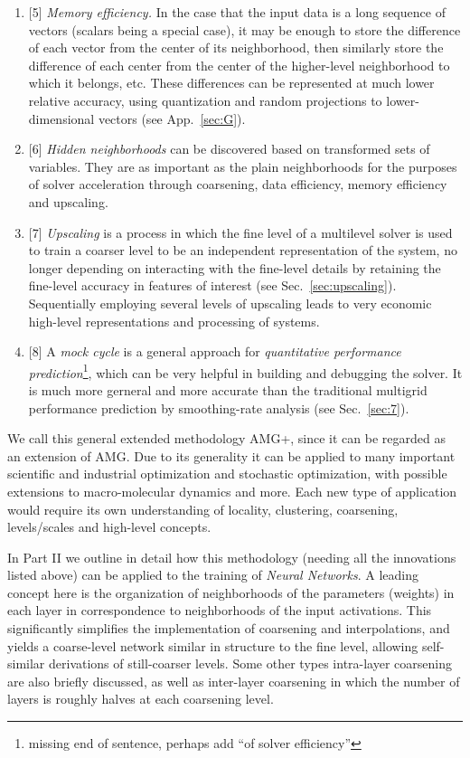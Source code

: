 \documentclass{article} %
\begin{document}
\begin{enumerate}
    \item{[5]} {\it Memory efficiency.} In the case that the input data is a long sequence of vectors (scalars being a special case), it may be enough to store the difference of each vector from the center of its neighborhood, then similarly store the difference of each center from the center of the higher-level neighborhood to which it belongs, etc. These differences can be represented at much lower relative accuracy, using quantization and random projections to lower-dimensional vectors (see App.~\ref{sec:G}).
    \item{[6]} {\it Hidden neighborhoods} can be discovered based on transformed sets of variables. They are as important as the plain neighborhoods for the purposes of solver acceleration through coarsening, data efficiency, memory efficiency and upscaling. 
    \item{[7]} {\it Upscaling} is a process in which the fine level of a multilevel solver is used to train a coarser level to be an independent representation of the system, no longer depending on interacting with the fine-level details by retaining the fine-level accuracy in features of interest (see Sec.~\ref{sec:upscaling}). Sequentially employing several levels of upscaling leads to very economic high-level representations and processing of systems.
    \item{[8]} A {\it mock cycle} is a general approach for {\it quantitative performance prediction}\footnote{missing end of sentence, perhaps add ``of solver efficiency''}, which can be very helpful in building and debugging the solver. It is much more gerneral and more accurate than the traditional multigrid performance prediction by smoothing-rate analysis (see Sec.~\ref{sec:7}). 
\end{enumerate}
We call this general extended methodology AMG+, since it can be regarded as an extension of AMG. Due to its generality it can be applied to many important scientific and industrial optimization and stochastic optimization, with possible extensions to macro-molecular dynamics and more. Each new type of application would require its own understanding of locality, clustering, coarsening, levels/scales and high-level concepts.

In Part II we outline in detail how this methodology (needing all the innovations listed above) can be applied to the training of {\it Neural Networks}. A leading concept here is the organization of neighborhoods of the parameters (weights) in each layer in correspondence to neighborhoods of the input activations. This significantly simplifies the implementation of coarsening and interpolations, and yields a coarse-level network similar in structure to the fine level, allowing self-similar derivations of still-coarser levels. Some other types intra-layer coarsening are also briefly discussed, as well as inter-layer coarsening in which the number of layers is roughly halves at each coarsening level.
\end{document}
